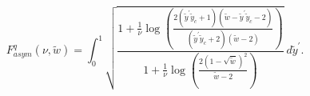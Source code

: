 \begin{equation}
F^q_{asym}(\nu,\tilde{w})=\int_0^{1}\sqrt{\frac{1+\frac{1}{\nu}\log\left(\frac{2(\tilde{y}^\prime
\tilde{y}_c +1)(\tilde{w}-\tilde{y}^\prime
\tilde{y}_c-2)}{(\tilde{y}^\prime
\tilde{y}_c+2)(\tilde{w}-2)}\right)}{1+\frac{1}{\nu}\log\left(\frac{2\left(1-\sqrt{\tilde{w}}\right)^2}{\tilde{w}-2}\right)}}~d\tilde{y}^\prime.
\end{equation}

